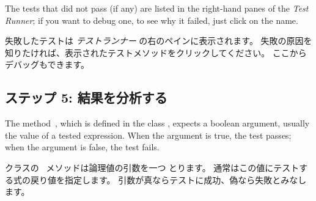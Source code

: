 \documentclass[a4paper,10pt,twoside]{book}
\begin{document}


The tests that did not pass (if any) are listed in the right-hand panes of
the \emph{Test Runner};
if you want to debug one, to see why it failed, just click on the name.
\fi

失敗したテストは \emph{テストランナー} の右のペインに表示されます。
失敗の原因を知りたければ、表示されたテストメソッドをクリックしてください。
ここからデバッグもできます。


\subsection{ステップ 5: 結果を分析する}

The method \,, which is defined in the class
, expects a boolean argument, usually the value of a tested expression.  When the argument is
true, the
test passes; when the argument is false, the test fails.
\fi

 クラスの \ メソッドは論理値の引数を一つ
とります。
通常はこの値にテストする式の戻り値を指定します。
引数が真ならテストに成功、偽なら失敗とみなします。
\end{document}
